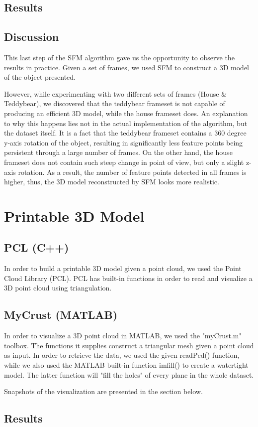 \subsection{Results}

\subsection{Discussion}
This last step of the SFM algorithm gave us the opportunity to observe the results in practice. Given a set of frames, we used SFM to construct a 3D model of the object presented. 

However, while experimenting with two different sets of frames (House \& Teddybear), we discovered that the teddybear frameset is not capable of producing an efficient 3D model, while the house frameset does. An explanation to why this happens lies not in the actual implementation of the algorithm, but the dataset itself. It is a fact that the teddybear frameset contains a 360 degree y-axis rotation of the object, resulting in significantly less feature points being persistent through a large number of frames. 
On the other hand, the house frameset does not contain such steep change in point of view, but only a slight z-axis rotation. As a result, the number of feature points detected in all frames is higher, thus, the 3D model reconstructed by SFM looks more realistic.

\section{Printable 3D Model}

\subsection{PCL (C++)}
In order to build a printable 3D model given a point cloud, we used the Point Cloud Library (PCL)\cite{pcl}. PCL has built-in functions in order to read and visualize a 3D point cloud using triangulation. 

\subsection{MyCrust (MATLAB)}
In order to visualize a 3D point cloud in MATLAB, we used the "myCrust.m" toolbox\cite{myc}. The functions it supplies construct a triangular mesh given a point cloud as input. In order to retrieve the data, we used the given readPcd() function, while we also used the MATLAB built-in function imfill() to create a watertight model. The latter function will "fill the holes" of every plane in the whole dataset. 

Snapshots of the visualization are presented in the section below.
\subsection{Results} 
